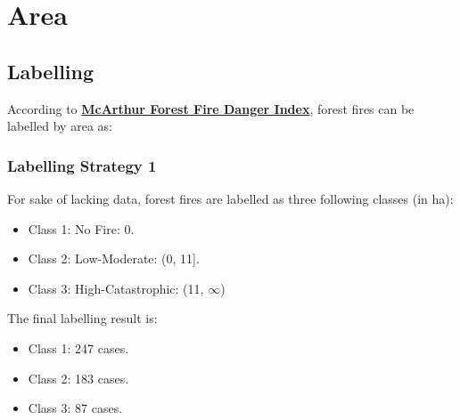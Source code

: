 \documentclass[titlepage,a4paper,12pt,thmsb]{report}
\begin{document}
\chapter{Area}
\section{Labelling}

According to {\bf \href{https://en.wikipedia.org/wiki/McArthur_Forest_Fire_Danger_Index}{McArthur Forest Fire Danger Index}}, forest fires can be labelled by area as:

\begin{center}
\begin{figure}[h]
{\par}
\end{figure}
{}
\end{center}



\newpage

\subsection{Labelling Strategy 1}

For sake of lacking data, forest fires are labelled as three following classes (in ha):

\begin{itemize}
\item{Class 1: No Fire: 0.}
\item{Class 2: Low-Moderate: (0, 11].}
\item{Class 3: High-Catastrophic: (11, $\infty$)}
\end{itemize}

The final labelling result is:

\begin{itemize}
\item{Class 1: 247 cases.}
\item{Class 2: 183 cases.}
\item{Class 3: 87 cases.}
\end{itemize}

\begin{center}
\begin{figure}[h]
{\par}
\end{figure}
{}
\end{center}
\end{document}
